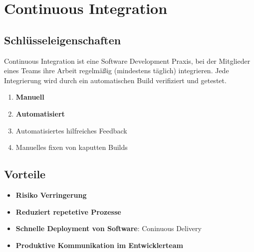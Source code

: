 
\chapter{Continuous Integration}

\section{Schlüsseleigenschaften}
Continuous Integration ist eine Software Development Praxis, bei der Mitglieder eines Teams
ihre Arbeit regelmäßig (mindestens täglich) integrieren. Jede Integrierung wird durch ein automatischen
Build verifiziert und getestet.

\begin{enumerate}
    \item \textbf{Manuell}
    \item \textbf{Automatisiert}
    \item Automatisiertes hilfreiches Feedback
    \item Manuelles fixen von kaputten Builds
\end{enumerate}

\section{Vorteile}
\begin{itemize}
    \item \textbf{Risiko Verringerung}
    \item \textbf{Reduziert repetetive Prozesse}
    \item \textbf{Schnelle Deployment von Software}: Coninuous Delivery
    \item \textbf{Produktive Kommunikation im Entwicklerteam}
\end{itemize}

